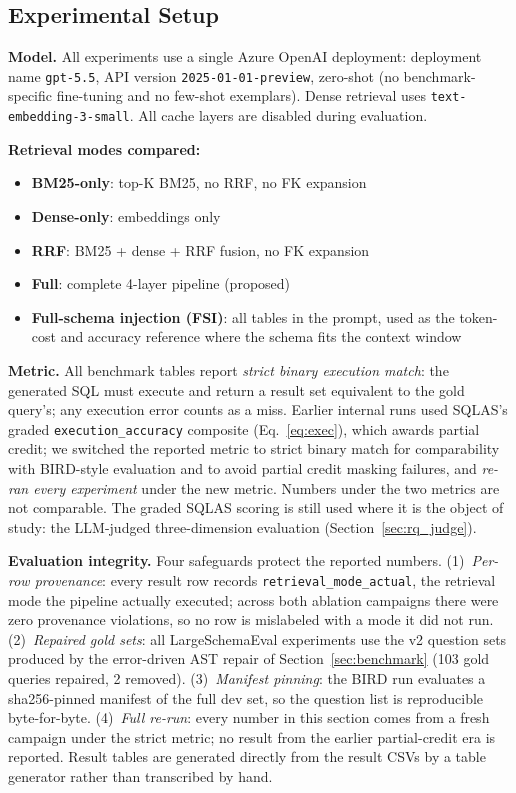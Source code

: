 \documentclass[conference]{IEEEtran}
\begin{document}
\subsection{Experimental Setup}

\textbf{Model.} All experiments use a single Azure OpenAI deployment:
deployment name \texttt{gpt-5.5}, API version \texttt{2025-01-01-preview},
zero-shot (no benchmark-specific fine-tuning and no few-shot exemplars).
Dense retrieval uses \texttt{text-embedding-3-small}. All cache layers
are disabled during evaluation.

\textbf{Retrieval modes compared:}
\begin{itemize}
  \item \textbf{BM25-only}: top-K BM25, no RRF, no FK expansion
  \item \textbf{Dense-only}: embeddings only
  \item \textbf{RRF}: BM25 + dense + RRF fusion, no FK expansion
  \item \textbf{Full}: complete 4-layer pipeline (proposed)
  \item \textbf{Full-schema injection (FSI)}: all tables in the prompt,
        used as the token-cost and accuracy reference where the schema
        fits the context window
\end{itemize}

\textbf{Metric.} All benchmark tables report \emph{strict binary
execution match}: the generated SQL must execute and return a result
set equivalent to the gold query's; any execution error counts as a
miss. Earlier internal runs used SQLAS's graded
\texttt{execution\_accuracy} composite (Eq.~\ref{eq:exec}), which awards
partial credit; we switched the reported metric to strict binary match
for comparability with BIRD-style evaluation and to avoid partial
credit masking failures, and \emph{re-ran every experiment} under the
new metric. Numbers under the two metrics are not comparable. The
graded SQLAS scoring is still used where it is the object of study:
the LLM-judged three-dimension evaluation (Section~\ref{sec:rq_judge}).

\textbf{Evaluation integrity.}
Four safeguards protect the reported numbers. (1)~\emph{Per-row
provenance}: every result row records \texttt{retrieval\_mode\_actual},
the retrieval mode the pipeline actually executed; across both ablation
campaigns there were zero provenance violations, so no row is
mislabeled with a mode it did not run. (2)~\emph{Repaired gold sets}:
all LargeSchemaEval experiments use the v2 question sets produced by
the error-driven AST repair of Section~\ref{sec:benchmark} (103 gold
queries repaired, 2 removed). (3)~\emph{Manifest pinning}: the BIRD
run evaluates a sha256-pinned manifest of the full dev set, so the
question list is reproducible byte-for-byte. (4)~\emph{Full re-run}:
every number in this section comes from a fresh campaign under the
strict metric; no result from the earlier partial-credit era is
reported. Result tables are generated directly from the result CSVs by
a table generator rather than transcribed by hand.
\end{document}
